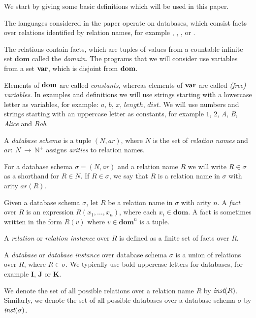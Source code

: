 We start by giving some basic definitions which will be used in this paper.

The languages considered in the paper operate on databases, which consist facts over relations identified by relation names, for example , , ,  or .

The relations contain facts, which are tuples of values from a countable infinite set $\textbf{dom}$ called the \emph{domain}. The programs that we will consider use variables from a set $\bf{var}$, which is disjoint from $\bf{dom}$. 

Elements of $\bf{dom}$ are called \emph{constants}, whereas elements of $\bf{var}$ are called \emph{(free) variables}.
In examples and definitions we will use strings starting with a lowercase letter as variables, for example: $a$, $b$, $x$, $length$, $dist$. We will use numbers and strings starting with an uppercase letter as constants, for example $1$, $2$, \textit{A}, \textit{B}, \textit{Alice} and \textit{Bob}.

\begin{defn}

A \emph{database schema} is a tuple $(N, ar)$, where $N$ is the set of \emph{relation names} and $ar:~N~\to~\mathbb{N}^+$ assigns \emph{arities} to relation names. 

For a database schema $\sigma = (N, ar)$ and a relation name $R$ we will write $R \in \sigma$ as a shorthand for $R \in N$. If $R \in \sigma$, we say that $R$ is a relation name in $\sigma$ with arity $ar(R)$.

Given a database schema $\sigma$, let $R$ be a relation name in $\sigma$ with arity $n$. A \emph{fact} over $R$ is an expression $R(x_1 , \dots , x_n)$, where each $x_i \in \textbf{dom}$. A fact is sometimes written in the form $R(v)$ where $v \in \textbf{dom}^n$ is a tuple.

A \emph{relation} or \emph{relation instance} over $R$ is defined as a finite set of facts over $R$.

A \emph{database} or \emph{database instance} over database schema $\sigma$ is a union of relations over $R$, where $R \in \sigma$. We typically use bold uppercase letters for databases, for example $\textbf{I}$, $\textbf{J}$ or $\textbf{K}$. 

We denote the set of all possible relations over a relation name $R$ by $\textit{inst}(R)$. Similarly, we denote the set of all possible databases over a database schema $\sigma$ by $\textit{inst}(\sigma)$.
\end{defn}

